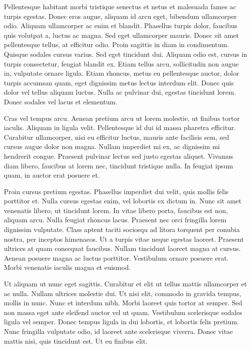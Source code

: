 Pellentesque habitant morbi tristique senectus et netus et malesuada fames ac turpis egestas. Donec eros augue, aliquam id arcu eget, bibendum ullamcorper odio. Aliquam ullamcorper ac enim et blandit. Phasellus turpis dolor, faucibus quis volutpat a, luctus ac magna. Sed eget ullamcorper mauris. Donec sit amet pellentesque tellus, at efficitur odio. Proin sagittis in diam in condimentum. Quisque sodales cursus varius. Sed eget tincidunt dui. Aliquam odio est, cursus in turpis consectetur, feugiat blandit ex. Etiam tellus arcu, sollicitudin non augue in, vulputate ornare ligula. Etiam rhoncus, metus eu pellentesque auctor, dolor turpis accumsan quam, eget dignissim metus lectus interdum elit. Donec quis dolor vel tellus aliquam luctus. Nulla ac pulvinar dui, egestas tincidunt lorem. Donec sodales vel lacus et elementum.

Cras vel tempus arcu. Aenean pretium arcu ut lorem molestie, ut finibus tortor iaculis. Aliquam in ligula velit. Pellentesque id dui id massa pharetra efficitur. Curabitur ullamcorper, nisi eu efficitur luctus, mauris ante facilisis sem, sed cursus augue dolor non magna. Nullam imperdiet mi ex, ac dignissim mi hendrerit congue. Praesent pulvinar lectus sed justo egestas aliquet. Vivamus diam libero, faucibus at lorem nec, tincidunt tristique nulla. In feugiat ipsum quam, in auctor erat posuere et.

Proin cursus pretium egestas. Phasellus imperdiet dui velit, quis mollis felis porttitor et. Nulla cursus egestas enim, vel lobortis ex dictum in. Nunc sit amet venenatis libero, ut tincidunt lorem. In vitae libero porta, faucibus est non, aliquam arcu. Nulla feugiat rhoncus lacus. Praesent nec orci fringilla lorem dignissim vulputate. Class aptent taciti sociosqu ad litora torquent per conubia nostra, per inceptos himenaeos. Ut a turpis vitae neque egestas laoreet. Praesent ultrices at quam consequat faucibus. Nullam tincidunt laoreet magna at cursus. Aenean posuere magna ac luctus porttitor. Vestibulum ornare posuere erat. Morbi venenatis iaculis magna et euismod.

Ut aliquam ut nunc eget sagittis. Curabitur et elit ut tellus mattis ullamcorper et ac nulla. Nullam ultrices molestie dui. Ut nisi elit, commodo in gravida tempus, mollis in nunc. Nunc et interdum nibh. Morbi laoreet quis tortor at semper. Sed non massa eget ante eleifend auctor vel ut quam. Vestibulum scelerisque sodales ligula vel semper. Donec tempus ligula in dui lobortis, et lobortis felis pretium. Nunc fringilla vulputate odio, id laoreet ante scelerisque viverra. Donec vitae mattis nisi, quis tincidunt est. Ut eu finibus elit.

